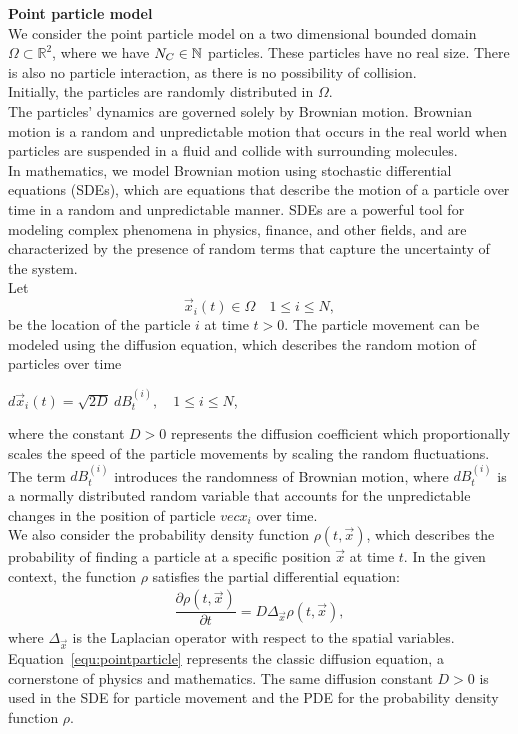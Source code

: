 \textbf{Point particle model} \\
We consider the point particle model on a two dimensional bounded domain $\Omega \subset \mathbb{R}^2$, where we have $N_C \in \mathbb{N}$ particles.
These particles have no real size.
There is also no particle interaction, as there is no possibility of collision. \\
Initially, the particles are randomly distributed in $\Omega$. \\
The particles' dynamics are governed solely by Brownian motion.
Brownian motion is a random and unpredictable motion that occurs in the real world when particles are suspended in a fluid and collide with surrounding molecules. \\
In mathematics, we model Brownian motion using stochastic differential equations (SDEs), which are equations that describe the motion of a particle over time in a random and unpredictable manner. 
SDEs are a powerful tool for modeling complex phenomena in physics, finance, and other fields, and are characterized by the presence of random terms that capture the uncertainty of the system. \\
Let 
\[\vec{x}_i(t) \in \Omega \quad 1 \leq i \leq N,\]
be the location of the particle $i$ at time $t > 0$. 
The particle movement can be modeled using the diffusion equation, which describes the random motion of particles over time
\begin{center}
	$d\vec{x}_i(t) = \sqrt{2D} \: dB_t^{(i)}, \quad 1 \leq i \leq N$,
\end{center}
where the constant $D > 0$ represents the diffusion coefficient which proportionally scales the speed of the particle movements by scaling the random fluctuations.
The term $dB_t^{(i)}$ introduces the randomness of Brownian motion, where $dB_t^{(i)}$ is a normally distributed random variable that accounts for the unpredictable changes in the position of particle $vec{x}_i$ over time. \\
We also consider the probability density function $\rho(t, \vec{x})$, which describes the probability of finding a particle at a specific position $\vec{x}$ at time $t$.
In the given context, the function $\rho$ satisfies the partial differential equation:
\begin{align}
	\dfrac{\partial \rho (t, \vec{x})}{\partial t} = D \Delta_{\vec{x}} \rho(t, \vec{x}) ,
	\label{equ:pointparticle}
\end{align}
where $\Delta_{\vec{x}}$ is the Laplacian operator with respect to the spatial variables. \\
Equation~\eqref{equ:pointparticle} represents the classic diffusion equation, a cornerstone of physics and mathematics.
The same diffusion constant $D>0$ is used in the SDE for particle movement and the PDE for the probability density function $\rho$. \\



